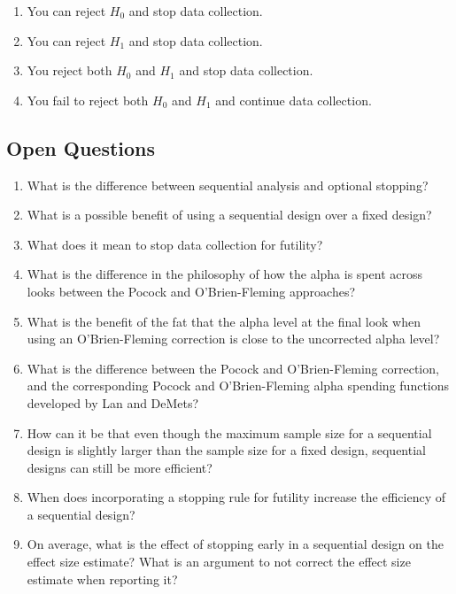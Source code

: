\documentclass[
  oneside]{book}
\providecommand{\tightlist}{%
  \setlength{\itemsep}{0pt}\setlength{\parskip}{0pt}}
\begin{document}
\begin{enumerate}
\def\labelenumi{\Alph{enumi})}
\tightlist
\item
  You can reject \(H_0\) and stop data collection.
\item
  You can reject \(H_1\) and stop data collection.
\item
  You reject both \(H_0\) and \(H_1\) and stop data collection.
\item
  You fail to reject both \(H_0\) and \(H_1\) and continue data collection.
\end{enumerate}

\hypertarget{open-questions-8}{%
\subsection{Open Questions}\label{open-questions-8}}

\begin{enumerate}
\def\labelenumi{\arabic{enumi}.}
\item
  What is the difference between sequential analysis and optional stopping?
\item
  What is a possible benefit of using a sequential design over a fixed design?
\item
  What does it mean to stop data collection for futility?
\item
  What is the difference in the philosophy of how the alpha is spent across looks between the Pocock and O'Brien-Fleming approaches?
\item
  What is the benefit of the fat that the alpha level at the final look when using an O'Brien-Fleming correction is close to the uncorrected alpha level?
\item
  What is the difference between the Pocock and O'Brien-Fleming correction, and the corresponding Pocock and O'Brien-Fleming alpha spending functions developed by Lan and DeMets?
\item
  How can it be that even though the maximum sample size for a sequential design is slightly larger than the sample size for a fixed design, sequential designs can still be more efficient?
\item
  When does incorporating a stopping rule for futility increase the efficiency of a sequential design?
\item
  On average, what is the effect of stopping early in a sequential design on the effect size estimate? What is an argument to not correct the effect size estimate when reporting it?
\end{enumerate}
\end{document}
